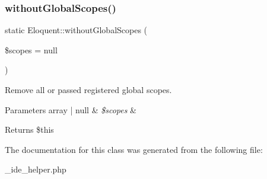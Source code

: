 \subsubsection{\texorpdfstring{without\+Global\+Scopes()}{withoutGlobalScopes()}}
{\footnotesize\ttfamily static Eloquent\+::without\+Global\+Scopes (\begin{DoxyParamCaption}\item[{}]{\$scopes = {\ttfamily null} }\end{DoxyParamCaption})\hspace{0.3cm}{\ttfamily [static]}}

Remove all or passed registered global scopes.


\begin{DoxyParams}[1]{Parameters}
array | null & {\em \$scopes} & \\
\hline
\end{DoxyParams}
\begin{DoxyReturn}{Returns}
\$this 
\end{DoxyReturn}


The documentation for this class was generated from the following file\+:\begin{DoxyCompactItemize}
\item 
\+\_\+ide\+\_\+helper.\+php\end{DoxyCompactItemize}
